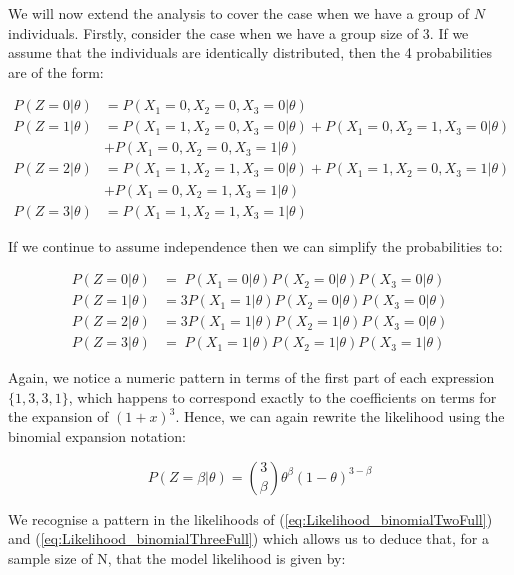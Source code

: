 \documentclass[11pt,fullpage]{book}
\begin{document}
We will now extend the analysis to cover the case when we have a group of $N$ individuals. Firstly, consider the case when we have a group size of 3. If we assume that the individuals are identically distributed, then the 4 probabilities are of the form:

\begin{equation}\label{eq:Likelihood_binomialThreeProbsSimple}
\begin{align}
P(Z = 0|\theta)& = P(X_1=0,X_2=0,X_3=0|\theta)\\
P(Z = 1|\theta)& = P(X_1=1,X_2=0,X_3=0|\theta)+P(X_1=0,X_2=1,X_3=0|\theta)\\
&  + P(X_1=0,X_2=0,X_3=1|\theta)\\
P(Z = 2|\theta)& = P(X_1=1,X_2=1,X_3=0|\theta) + P(X_1=1,X_2=0,X_3=1|\theta)\\
& + P(X_1=0,X_2=1,X_3=1|\theta)\\
P(Z = 3|\theta)& = P(X_1=1,X_2=1,X_3=1|\theta)
\end{align}
\end{equation}

If we continue to assume independence then we can simplify the probabilities to:

\begin{equation}\label{eq:Likelihood_binomialThreeProbsSimpler}
\begin{align}
P(Z = 0|\theta)& = \;P(X_1=0|\theta) P(X_2=0|\theta)  P(X_3=0|\theta)\\
P(Z = 1|\theta)& = 3P(X_1=1|\theta) P(X_2=0|\theta)  P(X_3=0|\theta)\\
P(Z = 2|\theta)& = 3P(X_1=1|\theta) P(X_2=1|\theta)  P(X_3=0|\theta)\\
P(Z = 3|\theta)& = \;P(X_1=1|\theta)P(X_2=1|\theta) P(X_3=1|\theta)
\end{align}
\end{equation}

Again, we notice a numeric pattern in terms of the first part of each expression $\{1,3,3,1\}$, which happens to correspond exactly to the coefficients on terms for the expansion of $(1+x)^3$. Hence, we can again rewrite the likelihood using the binomial expansion notation:

\begin{equation}\label{eq:Likelihood_binomialThreeFull}
P(Z=\beta|\theta) = {3 \choose \beta} \theta^\beta (1-\theta)^{3-\beta}
\end{equation}

We recognise a pattern in the likelihoods of (\ref{eq:Likelihood_binomialTwoFull}) and (\ref{eq:Likelihood_binomialThreeFull}) which allows us to deduce that, for a sample size of N, that the model likelihood is given by:
\end{document}

